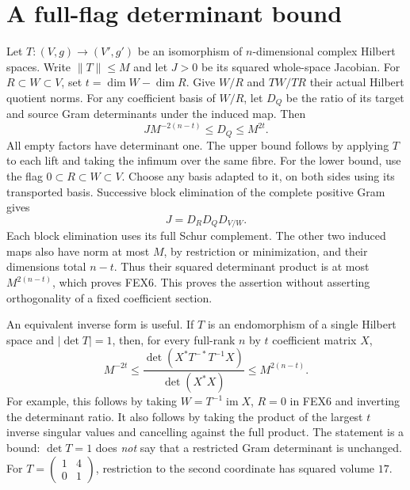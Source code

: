 \documentclass[11pt,a4paper]{article}
\begin{document}
\section{A full-flag determinant bound}
\label{sec:FEX-flag}
Let $T:(V,g)\to(V',g')$ be an isomorphism of $n$-dimensional complex
Hilbert spaces. Write $\|T\|\le M$ and let $J>0$ be its squared whole-space
Jacobian. For $R\subset W\subset V$, set $t=\dim W-\dim R$. Give $W/R$
and $TW/TR$ their actual Hilbert quotient norms. For any coefficient
basis of $W/R$, let $D_Q$ be the ratio of its target and source Gram
determinants under the induced map. Then
\[
 \boxed{\qquad J M^{-2(n-t)}\le D_Q\le M^{2t}.\qquad}
 \tag{FEX6}
\]
All empty factors have determinant one. The upper bound follows by
applying $T$ to each lift and taking the infimum over the same fibre.
For the lower bound, use the flag $0\subset R\subset W\subset V$.
Choose any basis adapted to it, on both sides using its transported
basis. Successive block elimination of the complete positive Gram gives
\[
 J=D_R D_Q D_{V/W}.
 \tag{FEX7}
\]
Each block elimination uses its full Schur complement. The other two
induced maps also have norm at most $M$, by restriction or minimization,
and their dimensions total $n-t$. Thus their squared determinant product
is at most $M^{2(n-t)}$, which proves FEX6. This proves the assertion
without asserting orthogonality of a fixed coefficient section.

An equivalent inverse form is useful. If $T$ is an endomorphism of a
single Hilbert space and $|\det T|=1$, then, for every full-rank $n$ by
$t$ coefficient matrix $X$,
\[
 \boxed{\quad
 M^{-2t}\le
 \frac{\det(X^*T^{-*}T^{-1}X)}{\det(X^*X)}
 \le M^{2(n-t)}.
 \quad}\tag{FEX8}
\]
For example, this follows by taking $W=T^{-1}\operatorname{im}X$, $R=0$
in FEX6 and inverting the determinant ratio. It also follows by taking
the product of the largest $t$ inverse singular values and cancelling
against the full product. The statement is a bound: $\det T=1$ does
\emph{not} say that a restricted Gram determinant is unchanged.
For $T=\left(\begin{smallmatrix}1&4\\0&1\end{smallmatrix}\right)$,
restriction to the second coordinate has squared volume $17$.
\end{document}
